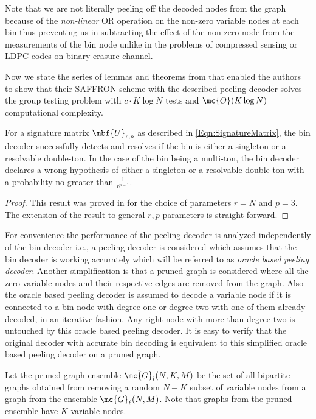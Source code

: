 \documentclass[conference,twocolumn]{IEEEtran}
\begin{document}
\begin{Remark}
 Note that we are not literally peeling off the decoded nodes from the graph because of the \textit{non-linear} OR operation on the non-zero variable nodes at each bin thus preventing us in subtracting the effect of the non-zero node from the measurements of the bin node unlike in the problems of compressed sensing or LDPC codes on binary erasure channel.
\end{Remark}

Now we state the series of lemmas and theorems from \cite{lee2015saffron} that enabled the authors to show that their SAFFRON scheme with the described peeling decoder solves the group testing problem with $c\cdot K\log N$ tests and $\mc{O}(K\log N)$ computational complexity.

\begin{lemma}
\label{Lem:BinDecoderAnalysis}
For a signature matrix $\mbf{U}_{r,p}$ as described in \eqref{Eqn:SignatureMatrix}, the bin decoder successfully detects and resolves if the bin is either a singleton or a resolvable double-ton. In the case of the bin being a multi-ton, the bin decoder declares a wrong hypothesis of either a singleton or a resolvable double-ton with a probability no greater than $\frac{1}{r^{p-1}}$.
\end{lemma}
\begin{proof}
This result was proved in \cite{lee2015saffron} for the choice of parameters $r=N$ and $p=3$. The extension of the result to general $r,p$ parameters is straight forward.
\end{proof}

For convenience the performance of the peeling decoder is analyzed independently of the bin decoder i.e., a peeling decoder is considered which assumes that the bin decoder is working accurately which will be referred to as \textit{oracle based peeling decoder}. Another simplification is that a pruned graph is considered where all the zero variable nodes and their respective edges are removed from the graph. Also the oracle based peeling decoder is assumed to decode a variable node if it is connected to a bin node with degree one or degree two with one of them already decoded, in an iterative fashion. Any right node with more than degree two is untouched by this oracle based peeling decoder. It is easy to verify that the original decoder with accurate bin decoding is equivalent to this simplified oracle based peeling decoder on a pruned graph.
\begin{definition}
Let the pruned graph ensemble $\tilde{\mc{G}}_l(N,K,M)$ be the set of all bipartite graphs obtained from removing a random $N-K$ subset of variable nodes from a graph from the ensemble $\mc{G}_{\ell}(N,M)$. Note that graphs from the pruned ensemble have $K$ variable nodes. 
\end{definition}	
\end{document}
